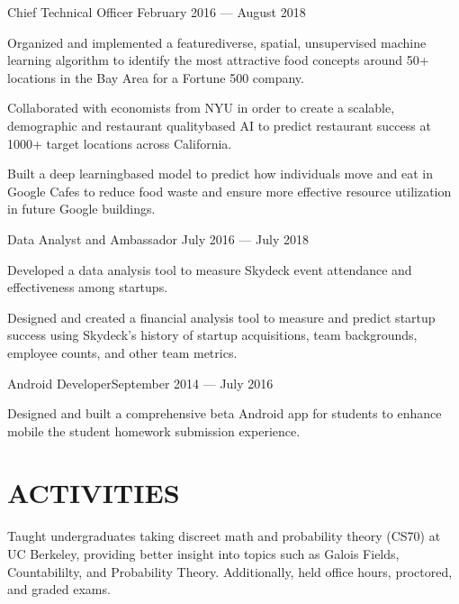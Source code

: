 \documentclass[10pt]{article}
\begin{document}
								{Chief Technical Officer}
								{February 2016 --- August 2018}                  		
	                   \begin{accomplishments} 
	                    		\item Organized and implemented a feature{\textendash}diverse, spatial, unsupervised machine learning algorithm to identify the most attractive food concepts around 50+ locations in the Bay Area for a Fortune 500 company.
	                    		\item Collaborated with economists from NYU in order to create a scalable, demographic and restaurant quality{\textendash}based AI to predict restaurant success at 1000+ target locations across California.
                          \item Built a deep learning{\textendash}based model to predict how individuals move and eat in Google Cafes to reduce food waste and ensure more effective resource utilization in future Google buildings.
	                    \end{accomplishments}
	                    		
	   		
	   		\employer{Skydeck Berkeley}{Berkeley, CA}
	   			{Data Analyst and Ambassador}
	   			{July 2016 --- July 2018}
			  		\begin{accomplishments}
	                   		\item Developed a data analysis tool to measure Skydeck event attendance and effectiveness among startups.
	                   		\item Designed and created a financial analysis tool to measure and predict startup success using Skydeck's history of startup acquisitions, team backgrounds, employee counts, and other team metrics.
	                  \end{accomplishments}
                  	 
                  	 
                {Android Developer}{September 2014 --- July 2016}
                 			\begin{accomplishments}					        
                   			\item Designed and built a comprehensive beta Android app for students to enhance mobile the student homework submission experience.
                  		 \end{accomplishments}
                  		 
                  
\section*{ACTIVITIES}
        {Taught undergraduates taking discreet math and probability theory (CS70) at UC Berkeley, providing better insight into topics such as Galois Fields, Countabililty, and Probability Theory. Additionally, held office hours, proctored, and graded exams.}
\end{document}
